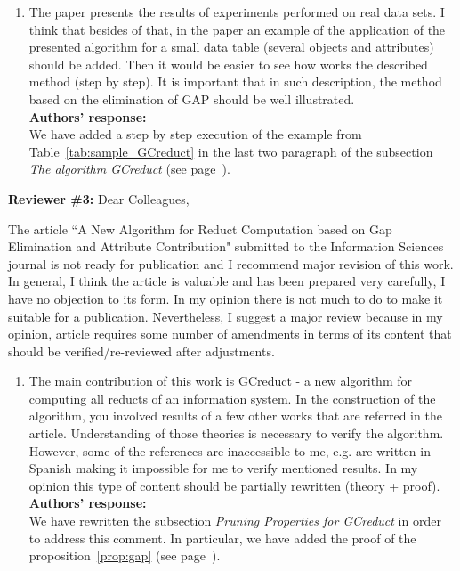 \documentclass{letter}
\begin{document}
\begin{letter}{}
\begin{enumerate}
	\item The paper presents the results of experiments performed on real data sets. I think that besides of that, in the paper an example of the application of the presented algorithm for a small data table (several objects and attributes) should be added. Then it would be easier to see how works the described method (step by step). It is important that in such description, the method based on the elimination of GAP should be well illustrated.\\
	\textbf{Authors’ response:} \\
	We have added a step by step execution of the example from Table~\ref{tab:sample_GCreduct} in the last two paragraph of the subsection \textit{The algorithm GCreduct} (see page~\pageref{par:step}).
  \end{enumerate}    
  
  
  \textbf{Reviewer \#3:} Dear Colleagues,
  
  The article ``A New Algorithm for Reduct Computation based on Gap Elimination and Attribute Contribution" submitted to the Information Sciences journal is not ready for publication and I recommend major revision of this work. In general, I think the article is valuable and has been prepared very carefully, I have no objection to its form. In my opinion there is not much to do to make it suitable for a publication. Nevertheless, I suggest a major review because in my opinion, article requires some number of amendments in terms of its content that should be verified/re-reviewed after adjustments.  
  
  \begin{enumerate}
	\item The main contribution of this work is GCreduct - a new algorithm for computing all reducts of an information system. In the construction of the algorithm, you involved results of a few other works that are referred in the article.  Understanding of those theories is necessary to verify the algorithm. However, some of the references are inaccessible  to me, e.g. are written in Spanish making it impossible for me to verify mentioned results. In my opinion this type of content should be partially rewritten (theory + proof).\\
	\textbf{Authors’ response:} \\
	We have rewritten the subsection \textit{Pruning Properties for GCreduct} in order to address this comment. In particular, we have added the proof of the proposition~\ref{prop:gap} (see page~\pageref{proof:gap}).
	

\end{enumerate}
\end{letter}
\end{document}
